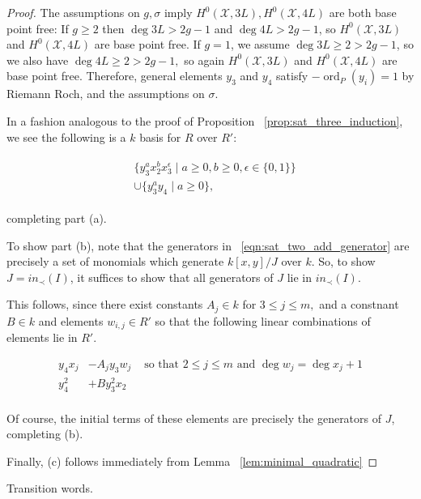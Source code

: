 \documentclass{amsart}
\theoremstyle{plain}
\theoremstyle{definition}
\theoremstyle{remark}
\numberwithin{equation}{section}
\newcommand \sx{\mathscr X}
\DeclareMathOperator{\ord}{ord}
\begin{document}
\begin{proof}
The assumptions on $g,\sigma$ imply $H^0(\sx, 3L), H^0(\sx, 4L)$ are both base point free: If $g \geq 2$ then $\deg 3L > 2g-1$ and $\deg 4L > 2g-1$, so $H^0(\sx, 3L)$ and $H^0(\sx, 4L)$ are base point free. If $g = 1$, we assume $\deg 3L \geq 2 > 2g-1$, so we also have $\deg 4L \geq 2 > 2g -1,$ so again $H^0(\sx, 3L)$ and $H^0(\sx, 4L)$ are base point free. Therefore, general elements $y_3$ and $y_4$ satisfy $-\ord
_P(y_i) = 1$ by Riemann Roch, and the assumptions on $\sigma$.  

In a fashion analogous to the proof of Proposition 
~\ref{prop:sat_three_induction}, we see 
the following is a $k$ basis for $R$ over $R'$:

\begin{align}
\label{eqn:sat_two_add_generator}
	\begin{split}
		&\{ y_3^ax_2^b x_3^\epsilon \mid a \geq 0, b 
		\geq 0, \epsilon \in \{0, 1\}\} \\
		&\cup \{ y_3^ay_4 \mid a \geq 0 \},
	\end{split}
\end{align}

\noindent completing part (a).

To show part (b), note that the generators in
~\ref{eqn:sat_two_add_generator} are precisely a set of monomials which
generate $k[x,y]/J$ over $k$. So, to show $J = in_\prec(I)$, it
suffices to show that all generators of $J$ lie in $in_\prec(I)$.

This follows, since there exist constants $A_j \in k$ for $3 \leq j \leq m,$ and a constnant $B \in k$ and
elements $w_{i,j} \in R'$ so that the following linear combinations
of elements lie in $R'$.

\begin{align*}
	y_4x_j &- A_j y_3 w_j & \text{ so that } 2 \leq j \leq m \text{ and } \deg w_j = \deg x_j + 1\\
	y_4^2 &+ B y_3^2 x_2 \\
\end{align*}

\noindent
Of course, the initial terms of these elements are precisely the
generators of $J$, completing (b).

Finally, (c) follows immediately from Lemma ~\ref{lem:minimal_quadratic}
\end{proof}

Transition words.
\end{document}
